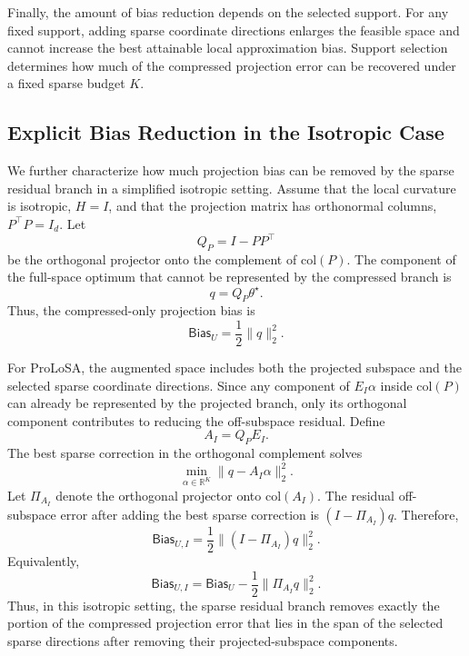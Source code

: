 Finally, the amount of bias reduction depends on the selected support.
For any fixed support, adding sparse coordinate directions enlarges the feasible space and cannot increase the best attainable local approximation bias.
Support selection determines how much of the compressed projection error can be recovered under a fixed sparse budget $K$.
\subsection{Explicit Bias Reduction in the Isotropic Case}
\label{app:isotropic_bias_reduction}

We further characterize how much projection bias can be removed by the sparse residual branch in a simplified isotropic setting.
Assume that the local curvature is isotropic, $H=I$, and that the projection matrix has orthonormal columns, $P^\top P=I_d$.
Let
\begin{equation}
Q_P=I-PP^\top
\label{eq:app_orthogonal_projector}
\end{equation}
be the orthogonal projector onto the complement of $\mathrm{col}(P)$.
The component of the full-space optimum that cannot be represented by the compressed branch is
\begin{equation}
q=Q_P\theta^\star .
\label{eq:app_off_subspace_residual}
\end{equation}
Thus, the compressed-only projection bias is
\begin{equation}
\mathsf{Bias}_{U}
=
\frac{1}{2}\|q\|_2^2 .
\label{eq:app_isotropic_comp_bias}
\end{equation}

For ProLoSA, the augmented space includes both the projected subspace and the selected sparse coordinate directions.
Since any component of $E_I\alpha$ inside $\mathrm{col}(P)$ can already be represented by the projected branch, only its orthogonal component contributes to reducing the off-subspace residual.
Define
\begin{equation}
A_I=Q_PE_I .
\label{eq:app_sparse_orthogonal_component}
\end{equation}
The best sparse correction in the orthogonal complement solves
\begin{equation}
\min_{\alpha\in\mathbb{R}^K}
\|q-A_I\alpha\|_2^2 .
\label{eq:app_best_sparse_correction}
\end{equation}
Let $\Pi_{A_I}$ denote the orthogonal projector onto $\mathrm{col}(A_I)$.
The residual off-subspace error after adding the best sparse correction is $(I-\Pi_{A_I})q$.
Therefore,
\begin{equation}
\mathsf{Bias}_{U,I}
=
\frac{1}{2}\|(I-\Pi_{A_I})q\|_2^2 .
\label{eq:app_isotropic_prolosa_bias}
\end{equation}
Equivalently,
\begin{equation}
\mathsf{Bias}_{U,I}
=
\mathsf{Bias}_{U}
-
\frac{1}{2}\|\Pi_{A_I}q\|_2^2 .
\label{eq:app_isotropic_bias_reduction}
\end{equation}
Thus, in this isotropic setting, the sparse residual branch removes exactly the portion of the compressed projection error that lies in the span of the selected sparse directions after removing their projected-subspace components.

